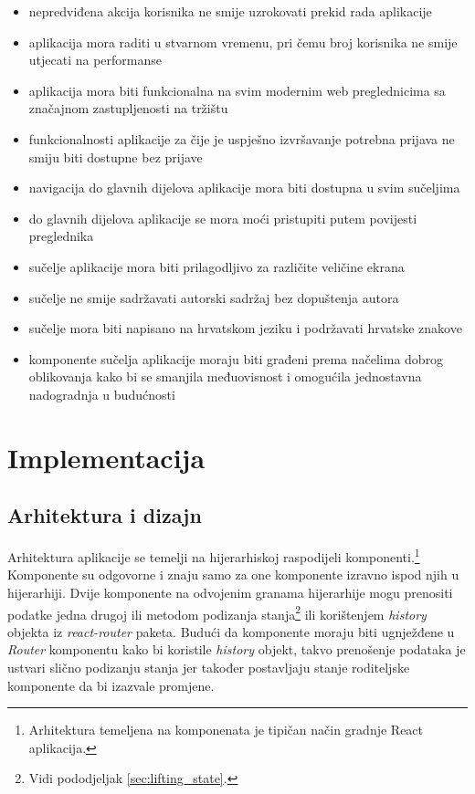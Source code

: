 \documentclass[times, utf8, zavrsni, numeric]{fer}
\newcommand{\razmaks}{\vspace{10pt}}
\begin{document}
\razmaks
\begin{itemize}
  \item nepredviđena akcija korisnika ne smije uzrokovati prekid rada aplikacije
  \item aplikacija mora raditi u stvarnom vremenu, pri čemu broj korisnika ne smije utjecati na performanse
  \item aplikacija mora biti funkcionalna na svim modernim web preglednicima sa značajnom zastupljenosti na tržištu
  \item funkcionalnosti aplikacije za čije je uspješno izvršavanje potrebna prijava ne smiju biti dostupne bez prijave
  \item navigacija do glavnih dijelova aplikacije mora biti dostupna u svim sučeljima
  \item do glavnih dijelova aplikacije se mora moći pristupiti putem povijesti preglednika
  \item sučelje aplikacije mora biti prilagodljivo za različite veličine ekrana
  \item sučelje ne smije sadržavati autorski sadržaj bez dopuštenja autora
  \item sučelje mora biti napisano na hrvatskom jeziku i podržavati hrvatske znakove
  \item komponente sučelja aplikacije moraju biti građeni prema načelima dobrog oblikovanja kako bi se smanjila međuovisnost i omogućila jednostavna nadogradnja u budućnosti
\end{itemize}


\chapter{Implementacija}


\section{Arhitektura i dizajn}

Arhitektura aplikacije se temelji na hijerarhiskoj raspodijeli komponenti.\footnote{Arhitektura temeljena na komponenata  je tipičan način gradnje React aplikacija.\citep{understandingCBA}}
Komponente su odgovorne i znaju samo za one komponente izravno ispod njih u hijerarhiji.
Dvije komponente na odvojenim granama hijerarhije mogu prenositi podatke jedna drugoj ili metodom podizanja stanja\footnote{Vidi pododjeljak \ref{sec:lifting_state}.} ili korištenjem \emph{history} objekta iz \emph{react-router} paketa.
Budući da komponente moraju biti ugnježđene u \emph{Router} komponentu kako bi koristile \emph{history} objekt, takvo prenošenje podataka je ustvari slično podizanju stanja jer također postavljaju stanje roditeljske komponente da bi izazvale promjene. 
\end{document}

